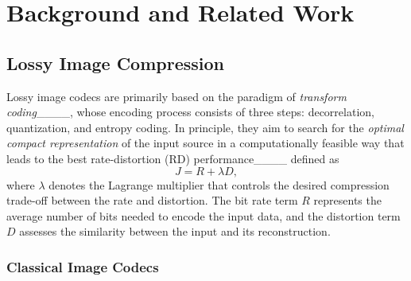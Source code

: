 \section{Background and Related Work}
\label{section_related_work}


    \subsection{Lossy Image Compression}\label{subsec:lossy-image-compression}

    Lossy image codecs are primarily based on the paradigm of \emph{transform coding}____, whose encoding process consists of three steps: decorrelation, quantization, and entropy coding.
    In principle, they aim to search for the \emph{optimal compact representation} of the input source in a computationally feasible way that leads to the best rate-distortion (RD) performance____ defined as
    \begin{equation}
    \label{RDO}
    J = R + \lambda D,
    \end{equation}
    where $\lambda$ denotes the Lagrange multiplier that controls the desired compression trade-off between the rate and distortion. The bit rate term $R$ represents the average number of bits needed to encode the input data, and the distortion term $D$ assesses the similarity between the input and its reconstruction.

    \subsubsection{Classical Image Codecs}

